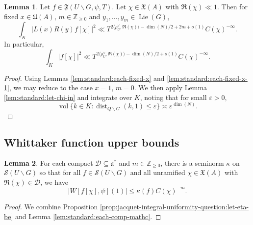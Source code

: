 \documentclass[reqno]{amsart}
\def\eps{\varepsilon}
\DeclareMathOperator{\dist}{dist}
\DeclareMathOperator{\Lie}{Lie}
\DeclareMathOperator{\vol}{vol}
\theoremstyle{plain} \newtheorem{theorem} {Theorem}
\theoremstyle{definition} \newtheorem{definition} [theorem] {Definition}
\theoremstyle{itplain} %
\newtheorem{lemma}[theorem]{Lemma}
\numberwithin{equation}{section}
\numberwithin{theorem}{section}
\renewcommand{\geq}{\geqslant}
\renewcommand{\leq}{\leqslant}
\begin{document}
\begin{lemma}\label{lem:scratch-research:let-f-in}
  Let $f \in \mathfrak{F}(U \backslash G, \psi, T)$.  Let $\chi \in \mathfrak{X}(A)$ with $\Re(\chi) \ll 1$.  Then for fixed $x \in \mathfrak{U}(A)$, $m \in \mathbb{Z}_{\geq 0}$ and $y_1,\dotsc,y_m \in \Lie(G)$,
  \begin{equation*}
    \int_K \left\lvert L(x) R(y) f[\chi] \right\rvert^2 \ll T^{2 \langle \rho_U^\vee, \Re(\chi) \rangle -\dim(N)/2 + 2 m + o(1)} C(\chi)^{-\infty}.
  \end{equation*}
  In particular,
  \begin{equation}\label{eq:int_k-fchi2-ll}
    \int_K \left\lvert f[\chi] \right\rvert^2 \ll T^{2 \langle \rho_U^\vee, \Re(\chi) \rangle -\dim(N)/2 + o(1)} C(\chi)^{-\infty}.
  \end{equation}
\end{lemma}
\begin{proof}
  Using Lemmas \ref{lem:standard:each-fixed-x} and \ref{lem:standard:each-fixed-x-1}, we may reduce to the case $x = 1$, $m = 0$.  We then apply Lemma \ref{lem:standard:let-chi-in} and integrate over $K$, noting that for small $\eps > 0$,
  \begin{equation*}
    \vol \{k \in K : \dist_{Q \backslash G}(k,1) \leq \eps \} \asymp \eps^{\dim(N)}.
  \end{equation*}
\end{proof}


\subsection{Whittaker function upper bounds}


\begin{lemma}\label{lem:standard:each-comp-mathc-1}
  For each compact $\mathcal{D} \subseteq \mathfrak{a}^*$ and $m \in \mathbb{Z}_{\geq 0}$, there is a seminorm $\kappa$ on $\mathcal{S}(U \backslash G)$ so that for all $f \in \mathcal{S}(U \backslash G)$ and all unramified $\chi \in \mathfrak{X}(A)$ with $\Re(\chi) \in \mathcal{D}$, we have
  \begin{equation*}
    |W[f[\chi], \psi](1)| \leq \kappa(f) C(\chi)^{-m}.
  \end{equation*}
\end{lemma}
\begin{proof}
  We combine Proposition \ref{prop:jacquet-integral-uniformity-question:let-eta-be} and Lemma \ref{lem:standard:each-comp-mathc}.
\end{proof}
\end{document}
